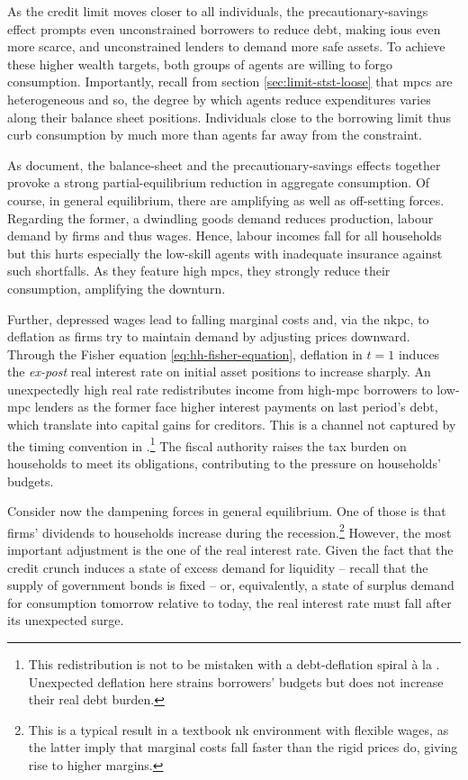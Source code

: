 \documentclass[a4paper,12pt]{article} %
\numberwithin{equation}{section} %
\numberwithin{figure}{section}
\numberwithin{table}{section}
\begin{document}
As the credit limit moves closer to all individuals, the precautionary-savings effect prompts even unconstrained borrowers to reduce debt, making \Gls{iou}s even more scarce, and unconstrained lenders to demand more safe assets. To achieve these higher wealth targets, both groups of agents are willing to forgo consumption. Importantly, recall from section \ref{sec:limit-stst-loose} that \Gls{mpc}s are heterogeneous and so, the degree by which agents reduce expenditures varies along their balance sheet positions. Individuals close to the borrowing limit thus curb consumption by much more than agents far away from the constraint.

As \textcite{gl2017} document, the balance-sheet and the precautionary-savings effects together provoke a strong partial-equilibrium reduction in aggregate consumption. Of course, in general equilibrium, there are amplifying as well as off-setting forces. Regarding the former, a dwindling goods demand reduces production, labour demand by firms and thus wages. Hence, labour incomes fall for all households but this hurts especially the low-skill agents with inadequate insurance against such shortfalls. As they feature high \Gls{mpc}s, they strongly reduce their consumption, amplifying the downturn.

Further, depressed wages lead to falling marginal costs and, via the \Gls{nkpc}, to deflation as firms try to maintain demand by adjusting prices downward. Through the Fisher equation \eqref{eq:hh-fisher-equation}, deflation in $t=1$ induces the \textit{ex-post} real interest rate on initial asset positions to increase sharply. An unexpectedly high real rate redistributes income from high-\Gls{mpc} borrowers to low-\Gls{mpc} lenders as the former face higher interest payments on last period's debt, which translate into capital gains for creditors. This is a channel not captured by the timing convention in \textcite{gl2017}.\footnote{This redistribution is not to be mistaken with a debt-deflation spiral à la \textcite{fisher1933}. Unexpected deflation here strains borrowers' budgets but does not increase their real debt burden.} The fiscal authority raises the tax burden on households to meet its obligations, contributing to the pressure on households' budgets.

Consider now the dampening forces in general equilibrium. One of those is that firms' dividends to households increase during the recession.\footnote{This is a typical result in a textbook \Gls{nk} environment with flexible wages, as the latter imply that marginal costs fall faster than the rigid prices do, giving rise to higher margins.} However, the most important adjustment is the one of the real interest rate. Given the fact that the credit crunch induces a state of excess demand for liquidity -- recall that the supply of government bonds is fixed -- or, equivalently, a state of surplus demand for consumption tomorrow relative to today, the real interest rate must fall after its unexpected surge. 
\end{document}
